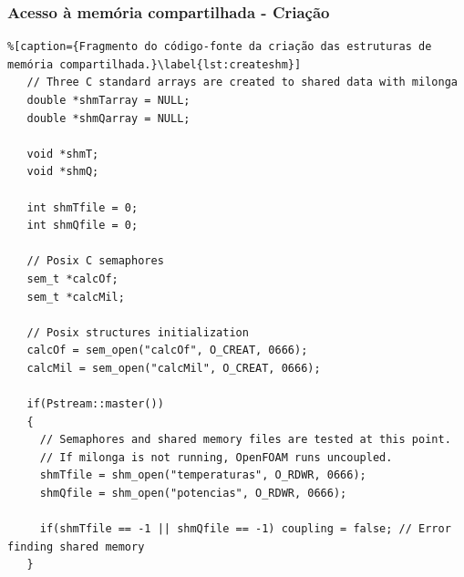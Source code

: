 \documentclass[svgnames,smaller,table]{beamer}
\begin{document}
\begin{frame}[fragile]
  \frametitle{Acesso à memória compartilhada - Criação}
 \begin{lstlisting}%[caption={Fragmento do código-fonte da criação das estruturas de memória compartilhada.}\label{lst:createshm}]
   // Three C standard arrays are created to shared data with milonga
   double *shmTarray = NULL;
   double *shmQarray = NULL;
   
   void *shmT;
   void *shmQ;

   int shmTfile = 0;
   int shmQfile = 0;
   
   // Posix C semaphores
   sem_t *calcOf;
   sem_t *calcMil;
   
   // Posix structures initialization
   calcOf = sem_open("calcOf", O_CREAT, 0666);
   calcMil = sem_open("calcMil", O_CREAT, 0666);
   
   if(Pstream::master())
   {
     // Semaphores and shared memory files are tested at this point.
     // If milonga is not running, OpenFOAM runs uncoupled.
     shmTfile = shm_open("temperaturas", O_RDWR, 0666);
     shmQfile = shm_open("potencias", O_RDWR, 0666);
    
     if(shmTfile == -1 || shmQfile == -1) coupling = false; // Error finding shared memory
   }
 \end{lstlisting}
\end{frame}
\end{document}

